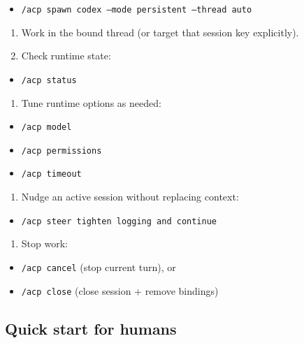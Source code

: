 \begin{itemize}
  \item \texttt{/acp spawn codex --mode persistent --thread auto}
\end{itemize}

\begin{enumerate}
  \item Work in the bound thread (or target that session key explicitly).
  \item Check runtime state:
\end{enumerate}

\begin{itemize}
  \item \texttt{/acp status}
\end{itemize}

\begin{enumerate}
  \item Tune runtime options as needed:
\end{enumerate}

\begin{itemize}
  \item \texttt{/acp model }
  \item \texttt{/acp permissions }
  \item \texttt{/acp timeout }
\end{itemize}

\begin{enumerate}
  \item Nudge an active session without replacing context:
\end{enumerate}

\begin{itemize}
  \item \texttt{/acp steer tighten logging and continue}
\end{itemize}

\begin{enumerate}
  \item Stop work:
\end{enumerate}

\begin{itemize}
  \item \texttt{/acp cancel} (stop current turn), or
  \item \texttt{/acp close} (close session + remove bindings)
\end{itemize}


\subsection{Quick start for humans}


